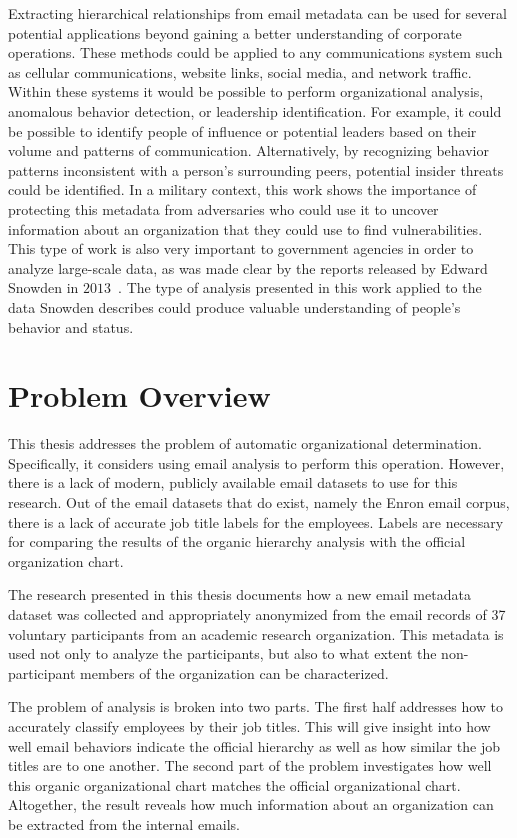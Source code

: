 \documentclass[12pt]{report}
\begin{document}
Extracting hierarchical relationships from email metadata can be used for several potential applications beyond gaining a better understanding of corporate operations.
These methods could be applied to any communications system such as cellular communications, website links, social media, and network traffic.
Within these systems it would be possible to perform organizational analysis, anomalous behavior detection, or leadership identification.
For example, it could be possible to identify people of influence or potential leaders based on their volume and patterns of communication.
Alternatively, by recognizing behavior patterns inconsistent with a person's surrounding peers, potential insider threats could be identified.
In a military context, this work shows the importance of protecting this metadata from adversaries who could use it to uncover information about an organization that they could use to find vulnerabilities.
This type of work is also very important to government agencies in order to analyze large-scale data, as was made clear by the reports released by Edward Snowden in $2013$~\cite{snowden}.
The type of analysis presented in this work applied to the data Snowden describes could produce valuable understanding of people's behavior and status. 



\section{Problem Overview}
This thesis addresses the problem of automatic organizational determination.
Specifically, it considers using email analysis to perform this operation.
However, there is a lack of modern, publicly available email datasets to use for this research.
Out of the email datasets that do exist, namely the Enron email corpus, there is a lack of accurate job title labels for the employees.
Labels are necessary for comparing the results of the organic hierarchy analysis with the official organization chart.

The research presented in this thesis documents how a new email metadata dataset was collected and appropriately anonymized from the email records of 37 voluntary participants from an academic research organization.
This metadata is used not only to analyze the participants, but also to what extent the non-participant members of the organization can be characterized.


The problem of analysis is broken into two parts.
The first half addresses how to accurately classify employees by their job titles.
This will give insight into how well email behaviors indicate the official hierarchy as well as how similar the job titles are to one another.
The second part of the problem investigates how well this organic organizational chart matches the official organizational chart.
Altogether, the result reveals how much information about an organization can be extracted from the internal emails.
\end{document}
